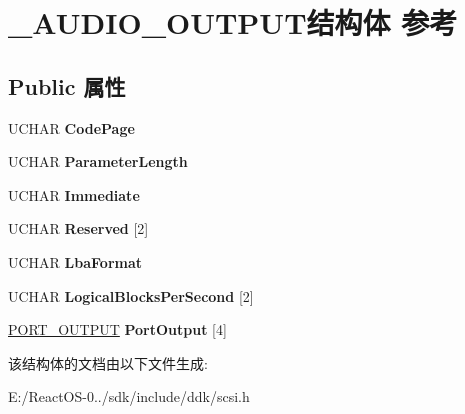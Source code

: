 \hypertarget{struct___a_u_d_i_o___o_u_t_p_u_t}{}\section{\+\_\+\+A\+U\+D\+I\+O\+\_\+\+O\+U\+T\+P\+U\+T结构体 参考}
\label{struct___a_u_d_i_o___o_u_t_p_u_t}
\subsection*{Public 属性}
\begin{DoxyCompactItemize}
\item 
\mbox{\label{struct___a_u_d_i_o___o_u_t_p_u_t_a26cdb78a6fb3d5c2e758472f62e0070e}} 
U\+C\+H\+AR {\bfseries Code\+Page}
\item 
\mbox{\label{struct___a_u_d_i_o___o_u_t_p_u_t_a05facc3560769597dceca438be58f3f2}} 
U\+C\+H\+AR {\bfseries Parameter\+Length}
\item 
\mbox{\label{struct___a_u_d_i_o___o_u_t_p_u_t_a535195280ea2d6d043addb84fbf8159e}} 
U\+C\+H\+AR {\bfseries Immediate}
\item 
\mbox{\label{struct___a_u_d_i_o___o_u_t_p_u_t_ab7c94a08e28d3ab9e92bf2104a706839}} 
U\+C\+H\+AR {\bfseries Reserved} \mbox{[}2\mbox{]}
\item 
\mbox{\label{struct___a_u_d_i_o___o_u_t_p_u_t_aac17d445d5737292877c502cc2fb6a65}} 
U\+C\+H\+AR {\bfseries Lba\+Format}
\item 
\mbox{\label{struct___a_u_d_i_o___o_u_t_p_u_t_a0f4cdc9ecafa67947014aff95bec12d8}} 
U\+C\+H\+AR {\bfseries Logical\+Blocks\+Per\+Second} \mbox{[}2\mbox{]}
\item 
\mbox{\label{struct___a_u_d_i_o___o_u_t_p_u_t_a6f7bb1d1742e8b80eff9fbb093a8c384}} 
\hyperlink{struct___p_o_r_t___o_u_t_p_u_t}{P\+O\+R\+T\+\_\+\+O\+U\+T\+P\+UT} {\bfseries Port\+Output} \mbox{[}4\mbox{]}
\end{DoxyCompactItemize}


该结构体的文档由以下文件生成\+:\begin{DoxyCompactItemize}
\item 
E\+:/\+React\+O\+S-\/0../sdk/include/ddk/scsi.\+h\end{DoxyCompactItemize}
